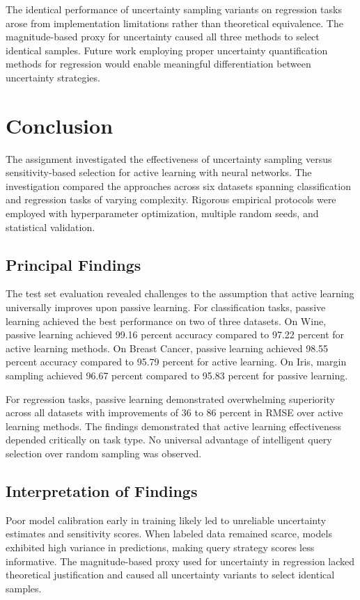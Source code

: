 \documentclass[conference]{IEEEtran}
\begin{document}
The identical performance of uncertainty sampling variants on regression tasks arose from implementation limitations rather than theoretical equivalence. The magnitude-based proxy for uncertainty caused all three methods to select identical samples. Future work employing proper uncertainty quantification methods for regression would enable meaningful differentiation between uncertainty strategies.

\section{Conclusion}

The assignment investigated the effectiveness of uncertainty sampling versus sensitivity-based selection for active learning with neural networks. The investigation compared the approaches across six datasets spanning classification and regression tasks of varying complexity. Rigorous empirical protocols were employed with hyperparameter optimization, multiple random seeds, and statistical validation.

\subsection{Principal Findings}

The test set evaluation revealed challenges to the assumption that active learning universally improves upon passive learning. For classification tasks, passive learning achieved the best performance on two of three datasets. On Wine, passive learning achieved 99.16 percent accuracy compared to 97.22 percent for active learning methods. On Breast Cancer, passive learning achieved 98.55 percent accuracy compared to 95.79 percent for active learning. On Iris, margin sampling achieved 96.67 percent compared to 95.83 percent for passive learning.

For regression tasks, passive learning demonstrated overwhelming superiority across all datasets with improvements of 36 to 86 percent in RMSE over active learning methods. The findings demonstrated that active learning effectiveness depended critically on task type. No universal advantage of intelligent query selection over random sampling was observed.

\subsection{Interpretation of Findings}

Poor model calibration early in training likely led to unreliable uncertainty estimates and sensitivity scores. When labeled data remained scarce, models exhibited high variance in predictions, making query strategy scores less informative. The magnitude-based proxy used for uncertainty in regression lacked theoretical justification and caused all uncertainty variants to select identical samples.
\end{document}
